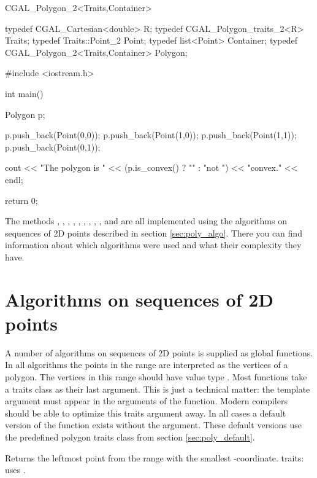 \begin{ccClassTemplate}{CGAL_Polygon_2<Traits,Container>}
\begin{cprog}
typedef CGAL_Cartesian<double> R;
typedef CGAL_Polygon_traits_2<R> Traits;
typedef Traits::Point_2 Point;
typedef list<Point> Container;
typedef CGAL_Polygon_2<Traits,Container> Polygon;

#include <iostream.h>

int main()
{
  Polygon p;

  p.push_back(Point(0,0));
  p.push_back(Point(1,0));
  p.push_back(Point(1,1));
  p.push_back(Point(0,1));

  cout << "The polygon is " << (p.is_convex() ? "" : "not ") << "convex." << endl;

  return 0;
}
\end{cprog}

The methods
,
,
,
,
,
,
,
,
,
 and
are all implemented using the algorithms on sequences of 2D points described
in section \ref{sec:poly_algo}. There you can find information about which
algorithms were used and what their complexity they have.

\end{ccClassTemplate}

\section{Algorithms on sequences of 2D points \label{sec:poly_algo}}

A number of algorithms on sequences of 2D points is supplied as global functions.
In all algorithms the points in the range \ccStyle{[first,last)} are interpreted
as the vertices of a polygon. The vertices in this range should have value type
. Most functions take a traits class as their last argument.
This is just a technical matter: the template argument  must
appear in the arguments of the function. Modern compilers should be able to
optimize this traits argument away. In all cases a default version of the function
exists without the  argument. These default versions use the predefined
polygon traits class from section \ref{sec:poly_default}.

{
Returns the leftmost point from the range \ccStyle{[first,last)}
with the smallest -coordinate.
{\sc traits}: uses .
}

